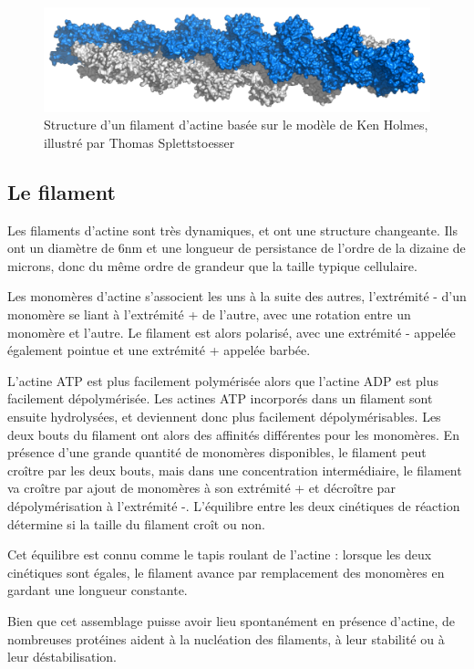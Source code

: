 \documentclass{report}
\begin{document}
\begin{figure}
\includegraphics[scale=0.3]{Actin_filament_atomic_model.png}
\caption{Structure d'un filament d'actine basée sur le modèle de Ken Holmes, illustré par Thomas Splettstoesser}
\end{figure}

\subsection{Le filament}

Les filaments d'actine sont très dynamiques, et ont une structure changeante. Ils ont un diamètre de 6nm et une longueur de persistance de l'ordre de la dizaine de microns, donc du même ordre de grandeur que la taille typique cellulaire. 

Les monomères d'actine s'associent les uns à la suite des autres, l'extrémité - d'un monomère se liant à l'extrémité + de l'autre, avec une rotation entre un monomère et l'autre. 
Le filament est alors polarisé, avec une extrémité - appelée également pointue et une extrémité + appelée barbée. 

L'actine ATP est plus facilement polymérisée alors que l'actine ADP est plus facilement dépolymérisée. 
Les actines ATP incorporés dans un filament sont ensuite hydrolysées, et deviennent donc plus facilement dépolymérisables.
Les deux bouts du filament ont alors des affinités différentes pour les monomères. En présence d'une grande quantité de monomères disponibles, le filament peut croître par les deux bouts, mais dans une concentration intermédiaire, le filament va croître par ajout de monomères à son extrémité + et décroître par dépolymérisation à l'extrémité -. L'équilibre entre les deux cinétiques de réaction détermine si la taille du filament croît ou non. 

Cet équilibre est connu comme le \og tapis roulant \fg de l'actine : lorsque les deux cinétiques sont égales, le filament avance par remplacement des monomères en gardant une longueur constante. 

Bien que cet assemblage puisse avoir lieu spontanément en présence d'actine, de nombreuses protéines aident à la nucléation des filaments, à leur stabilité ou à leur déstabilisation. 
\end{document}

